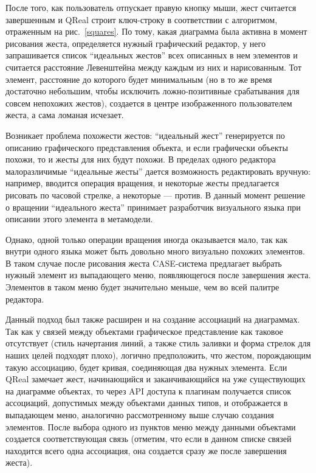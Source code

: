 \documentclass[a5paper]{article}
\begin{document}
После того, как пользователь отпускает правую кнопку мыши, жест считается завершенным и QReal строит ключ-строку в соответствии с алгоритмом, отраженным на рис.~\ref{squares}. По тому, какая диаграмма была активна в момент рисования жеста, определяется нужный графический редактор, у него запрашивается список ``идеальных жестов'' всех описанных в нем элементов и считается расстояние Левенштейна между каждым из них и нарисованным. Тот элемент, расстояние до которого будет минимальным (но в то же время достаточно небольшим, чтобы исключить ложно-позитивные срабатывания для совсем непохожих жестов), создается в центре изображенного пользователем жеста, а сама ломаная исчезает. 

Возникает проблема похожести жестов: ``идеальный жест'' генерируется по описанию графического представления объекта, и если графически объекты похожи, то и жесты для них будут похожи. В пределах одного редактора малоразличимые ``идеальные жесты'' дается возможность редактировать вручную: например, вводится операция вращения, и некоторые жесты предлагается рисовать по часовой стрелке, а некоторые --- против. В данный момент решение о вращении ``идеального жеста'' принимает разработчик визуального языка при описании этого элемента в метамодели. 

Однако, одной только операции вращения иногда оказывается мало, так как внутри одного языка может быть довольно много визуально похожих элементов. В таком случае после рисования жеста CASE-система предлагает выбрать нужный элемент из выпадающего меню, появляющегося после завершения жеста. Элементов в таком меню будет значительно меньше, чем во всей палитре редактора.

Данный подход был также расширен и на создание ассоциаций на диаграммах. Так как у связей между объектами графическое представление как таковое отсутствует (стиль начертания линий, а также стиль заливки и форма стрелок для наших целей подходят плохо), логично 
предположить, что жестом, порождающим такую ассоциацию, будет кривая, соединяющая два нужных элемента. Если QReal замечает жест, начинающийся и заканчивающийся на уже существующих на диаграмме объектах, то через API доступа к плагинам получается список 
ассоциаций, допустимых между объектами данных типов, и отображается в выпадающем меню, аналогично рассмотренному выше случаю создания элементов. После выбора одного из пунктов меню между данными объектами создается соответствующая связь (отметим, что если в данном списке связей находится всего одна ассоциация, она создается сразу же после завершения жеста).
\end{document}
